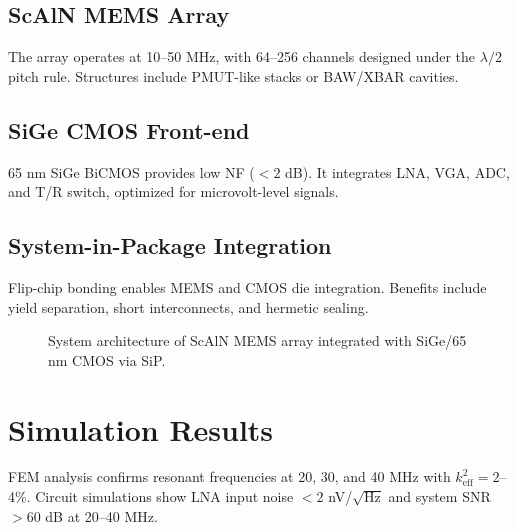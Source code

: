 \documentclass[conference]{IEEEtran}
\begin{document}
\subsection{ScAlN MEMS Array}
The array operates at 10--50 MHz, with 64--256 channels designed under the $\lambda/2$ pitch rule. 
Structures include PMUT-like stacks or BAW/XBAR cavities.

\subsection{SiGe CMOS Front-end}
65 nm SiGe BiCMOS provides low NF ($< 2$ dB). 
It integrates LNA, VGA, ADC, and T/R switch, optimized for microvolt-level signals.

\subsection{System-in-Package Integration}
Flip-chip bonding enables MEMS and CMOS die integration. 
Benefits include yield separation, short interconnects, and hermetic sealing.

\begin{figure}[t]
\centering
{}
\caption{System architecture of ScAlN MEMS array integrated with SiGe/65 nm CMOS via SiP.}
\label{fig:architecture}
\end{figure}

\section{Simulation Results}
FEM analysis confirms resonant frequencies at 20, 30, and 40 MHz with $k^2_{\mathrm{eff}} = 2$--4\%. 
Circuit simulations show LNA input noise $< 2$ nV/$\sqrt{\mathrm{Hz}}$ and system SNR $> 60$ dB at 20--40 MHz.
\end{document}
